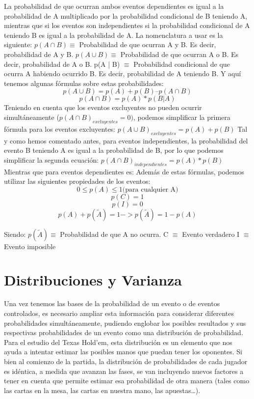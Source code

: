 La probabilidad de que ocurran ambos eventos dependientes es igual a la probabilidad de A multiplicado por la probabilidad condicional de B teniendo A, mientras que si los eventos son independientes si la probabilidad condicional de A teniendo B es igual a la probabilidad de A.
La nomenclatura a usar es la siguiente:
$p(A \cap B) \equiv$ Probabilidad de que ocurran A y B. Es decir, probabilidad de A y B.
$p(A \cup B) \equiv$ Probabilidad de que ocurran A o B. Es decir, probabilidad de A o B. 
p(A | B) $\equiv$ Probabilidad condicional de que ocurra A habiendo ocurrido B. Es decir, probabilidad de A teniendo B.
Y aquí tenemos algunas fórmulas sobre estas probabilidades:
\[
p(A \cup B) = p(A) + p(B) – p(A \cap B)
\]
\[
p(A\cap B) = p(A)*p(B | A)
\]
Teniendo en cuenta que los eventos excluyentes no pueden ocurrir simultáneamente ($p(A \cap B)_{excluyentes} = 0)$, podemos simplificar la primera fórmula para los eventos excluyentes:
$p(A \cup B)_{excluyentes} = p(A) + p(B)$
Tal y como hemos comentado antes, para eventos independientes, la probabilidad del evento B teniendo A es igual a la probabilidad de B, por lo que podemos simplificar la segunda ecuación:
$p(A \cap B)_{independientes} = p(A)*p(B)$
Mientras que para eventos dependientes es:
Además de estas fórmulas, podemos utilizar las siguientes propiedades de los eventos:
\[
0 \leq p(A) \leq 1\text{(para cualquier A)}
\]
\[
p(C) = 1
\]
\[
p(I) = 0
\]
\[
p(A) + p (\tilde{A}) = 1 -> p (\tilde{A}) = 1 - p(A)
\]

Siendo:
$p(\tilde{A}) \equiv$ Probabilidad de que A no ocurra.
C $\equiv$ Evento verdadero
I $\equiv$ Evento imposible


\section{Distribuciones y Varianza}

Una vez tenemos las bases de la probabilidad de un evento o de eventos controlados, es necesario ampliar esta información para considerar diferentes probabilidades simultáneamente, pudiendo englobar los posibles resultados y sus respectivas probabilidades de un evento como una distribución de probabilidad.
Para el estudio del Texas Hold’em, esta distribución es un elemento que nos ayuda a intentar estimar las posibles manos que puedan tener los oponentes. Si bien al comienzo de la partida, la distribución de probabilidades de cada jugador es idéntica, a medida que avanzan las fases, se van incluyendo nuevos factores a tener en cuenta que permite estimar esa probabilidad de otra manera (tales como las cartas en la mesa, las cartas en nuestra mano, las apuestas…).

